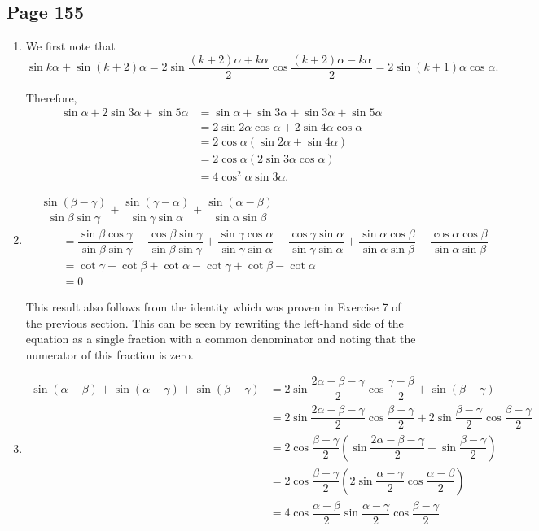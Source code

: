 \documentclass{article}
\newenvironment{solutions}[1]
{\subsection*{#1}
 \begin{enumerate}[leftmargin=1.5em]}
{\end{enumerate}}
\newcommand{\solution}{\item}
\begin{document}
\begin{solutions}{Page 155}
\solution %
We first note that
\[
\sin{k\alpha} + \sin{(k+2)\alpha} = 2\sin{\dfrac{(k+2)\alpha+k\alpha}{2}}\cos{\dfrac{(k+2)\alpha-k\alpha}{2}} = 2\sin{(k+1)\alpha}\cos{\alpha}.
\]

Therefore,
\begin{align*}
\sin{\alpha}+2\sin{3\alpha}+\sin{5\alpha} &= \sin{\alpha}+\sin{3\alpha}+\sin{3\alpha}+\sin{5\alpha} \\
&= 2\sin{2\alpha}\cos{\alpha} + 2\sin{4\alpha}\cos{\alpha} \\
&= 2\cos{\alpha} \left(\sin{2\alpha} + \sin{4\alpha}\right) \\
&= 2\cos{\alpha} \left(2\sin{3\alpha}\cos{\alpha}\right) \\
&= 4\cos^{2}{\alpha}\sin{3\alpha}.
\end{align*}

\solution %
\begin{align*}
&\dfrac{\sin\left(\beta-\gamma\right)}{\sin{\beta}\sin{\gamma}} + \dfrac{\sin\left(\gamma-\alpha\right)}{\sin{\gamma}\sin{\alpha}} + \dfrac{\sin\left(\alpha-\beta\right)}{\sin{\alpha}\sin{\beta}} \\
&\qquad= \dfrac{\sin{\beta}\cos{\gamma}}{\sin{\beta}\sin{\gamma}} - \dfrac{\cos{\beta}\sin{\gamma}}{\sin{\beta}\sin{\gamma}} + \dfrac{\sin{\gamma}\cos{\alpha}}{\sin{\gamma}\sin{\alpha}} - \dfrac{\cos{\gamma}\sin{\alpha}}{\sin{\gamma}\sin{\alpha}} +\dfrac{\sin{\alpha}\cos{\beta}}{\sin{\alpha}\sin{\beta}} - \dfrac{\cos{\alpha}\cos{\beta}}{\sin{\alpha}\sin{\beta}} \\
&\qquad= \cot{\gamma} - \cot{\beta} + \cot{\alpha} - \cot{\gamma} + \cot{\beta} - \cot{\alpha} \\
&\qquad= 0
\end{align*}

This result also follows from the identity which was proven in Exercise 7 of the previous section. This can be seen by rewriting the left-hand side of the equation as a single fraction with a common denominator and noting that the numerator of this fraction is zero.

\solution %
\begin{align*}
\sin\left(\alpha-\beta\right) + \sin\left(\alpha-\gamma\right) + \sin\left(\beta-\gamma\right) &= 2\sin{\dfrac{2\alpha-\beta-\gamma}{2}}\cos{\dfrac{\gamma-\beta}{2}} + \sin\left(\beta-\gamma\right) \\
&= 2\sin{\dfrac{2\alpha-\beta-\gamma}{2}}\cos{\dfrac{\beta-\gamma}{2}} + 2\sin{\dfrac{\beta-\gamma}{2}}\cos{\dfrac{\beta-\gamma}{2}} \\
&= 2\cos{\dfrac{\beta-\gamma}{2}} \left(\sin{\dfrac{2\alpha-\beta-\gamma}{2}} + \sin{\dfrac{\beta-\gamma}{2}}\right) \\
&= 2\cos{\dfrac{\beta-\gamma}{2}} \left(2\sin{\dfrac{\alpha-\gamma}{2}}\cos{\dfrac{\alpha-\beta}{2}}\right) \\
&= 4 \cos{\dfrac{\alpha-\beta}{2}} \sin{\dfrac{\alpha-\gamma}{2}} \cos{\dfrac{\beta-\gamma}{2}}
\end{align*}


\end{solutions}
\end{document}
